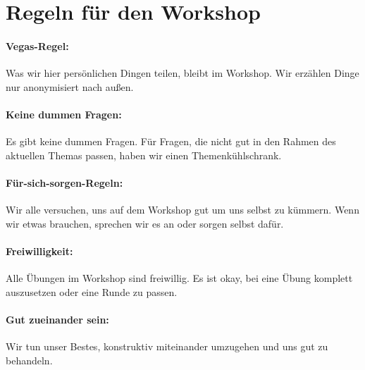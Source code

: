 \section{Regeln für den Workshop}
\label{gfk-workshopregeln}

\paragraph{Vegas-Regel:} Was wir hier persönlichen Dingen teilen, bleibt im Workshop. Wir erzählen Dinge nur anonymisiert nach außen.

\paragraph{Keine dummen Fragen:} Es gibt keine dummen Fragen. Für Fragen, die nicht gut in den Rahmen des aktuellen Themas passen, haben wir einen Themenkühlschrank.

\paragraph{Für-sich-sorgen-Regeln:} Wir alle versuchen, uns auf dem Workshop gut um uns selbst zu kümmern. Wenn wir etwas brauchen, sprechen wir es an oder sorgen selbst dafür.

\paragraph{Freiwilligkeit:} Alle Übungen im Workshop sind freiwillig. Es ist okay, bei eine Übung komplett auszusetzen oder eine Runde zu passen.

\paragraph{Gut zueinander sein:} Wir tun unser Bestes, konstruktiv miteinander umzugehen und uns gut zu behandeln.
